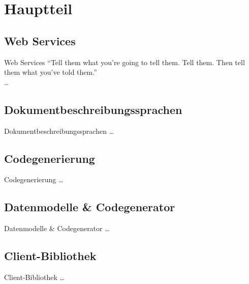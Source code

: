 \section{Hauptteil}

\subsection{Web Services}
\begin{frame}{Web Services}
    \enquote{Tell them what you’re going to tell them. Tell them. Then tell them what you’ve told them.}\\
    \ldots
\end{frame}

\subsection{Dokumentbeschreibungssprachen}
\begin{frame}{Dokumentbeschreibungssprachen}
	\ldots
\end{frame}

\subsection{Codegenerierung}
\begin{frame}{Codegenerierung}
	\ldots
\end{frame}

\subsection{Datenmodelle \& Codegenerator}
\begin{frame}{Datenmodelle \& Codegenerator}
	\ldots
\end{frame}

\subsection{Client-Bibliothek}
\begin{frame}{Client-Bibliothek}
	\ldots
\end{frame}
